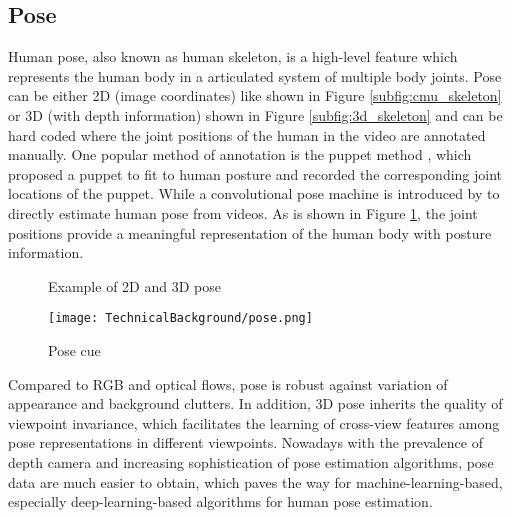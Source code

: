 \subsection{Pose}
Human pose, also known as human skeleton, is a high-level feature which represents the human body in a articulated system of multiple body joints. Pose can be either 2D (image coordinates) like shown in Figure \ref{subfig:cmu_skeleton} or 3D (with depth information) shown in Figure \ref{subfig:3d_skeleton} and can be hard coded where the joint positions of the human in the video are annotated manually. One popular method of annotation is the puppet method \cite{6751508}, which proposed a puppet to fit to human posture and recorded the corresponding joint locations of the puppet. While a convolutional pose machine is introduced by \cite{journals/corr/WeiRKS16} to directly estimate human pose from videos. As is shown in Figure \ref{fig:pose_cue}, the joint positions provide a meaningful representation of the human body with posture information. 

\begin{figure}[h!]
  \centering  
  \caption{Example of 2D and 3D pose}
\end{figure}
\addtocounter{footnote}{-1} 

\begin{figure}[h!]
  \centering
  \texttt{[image: TechnicalBackground/pose.png]}
  \caption{Pose cue}
  \label{fig:pose_cue}
\end{figure}

Compared to RGB and optical flows, pose is robust against variation of appearance and background clutters. In addition, 3D pose inherits the quality of viewpoint invariance, which facilitates the learning of cross-view features among pose representations in different viewpoints. Nowadays with the prevalence of depth camera and increasing sophistication of pose estimation algorithms, pose data are much easier to obtain, which paves the way for machine-learning-based, especially deep-learning-based algorithms for human pose estimation. 


